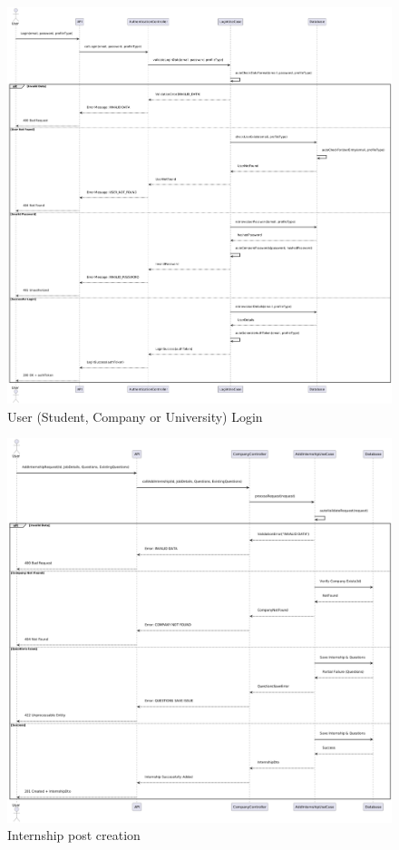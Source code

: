 \newpage

\begin{figure}[ht!]
    \centering
    \includegraphics[scale=0.27]{Images/ImagesSequenceDiagram/LoginAuthentication.png}
    \caption{User (Student, Company or University) Login}
\end{figure}

\newpage

\begin{figure}[ht!]
    \centering
    \includegraphics[scale=0.3]{Images/ImagesSequenceDiagram/InternshipCreation.png}
    \caption{Internship post creation}
\end{figure}


